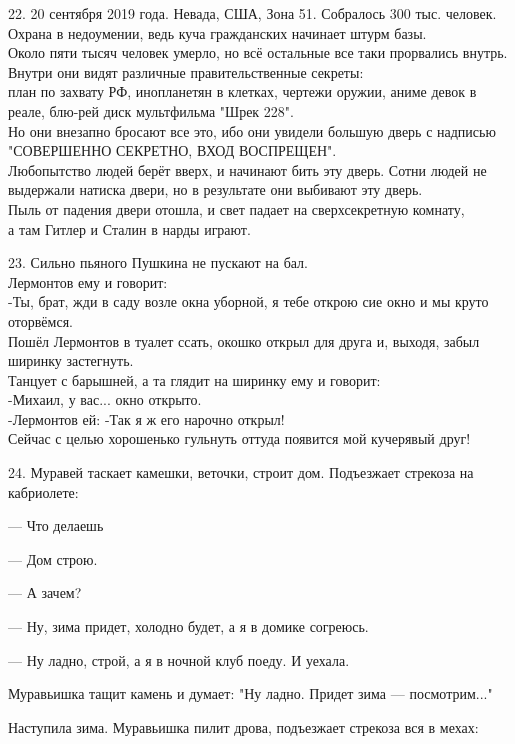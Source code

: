 \documentclass[a4paper,20pt,notitlepage]{extbook}
\begin{document}
	22. 20 сентября 2019 года. Невада, США, Зона 51. Собралось 300 тыс. человек.\\
	 Охрана в недоумении, ведь куча гражданских начинает штурм базы. \\
	 Около пяти тысяч человек умерло, но всё остальные все таки прорвались внутрь. Внутри они видят различные правительственные секреты:\\
	  план по захвату РФ, инопланетян в клетках, чертежи оружии, аниме девок в реале, блю-рей диск мультфильма "Шрек 228". \\
	  Но они внезапно бросают все это, ибо они увидели большую дверь с надписью "СОВЕРШЕННО СЕКРЕТНО, ВХОД ВОСПРЕЩЕН". \\
	  Любопытство людей берёт вверх, и начинают бить эту дверь. Сотни людей не выдержали натиска двери, но в результате они выбивают эту дверь.\\
	  Пыль от падения двери отошла, и свет падает на сверхсекретную комнату, \\
	  а там Гитлер и Сталин в нарды играют.
	  
	23. Сильно пьяного Пушкина не пускают на бал. \\
	Лермонтов ему и говорит:\\
	 -Ты, брат, жди в саду возле окна уборной, я тебе открою сие окно и мы круто оторвёмся. \\
	Пошёл Лермонтов в туалет ссать, окошко открыл для друга и, выходя, забыл ширинку застегнуть.\\
	Танцует с барышней, а та глядит на ширинку ему и говорит:\\
	-Михаил, у вас... окно открыто.\\
	-Лермонтов ей: -Так я ж его нарочно открыл! \\
	Сейчас с целью хорошенько гульнуть оттуда появится мой кучерявый друг!
	
	24. Муравей таскает камешки, веточки, строит дом. Подъезжает стрекоза на кабриолете:
	
	— Что делаешь
	
	— Дом строю.
	
	— А зачем?
	
	— Ну, зима придет, холодно будет, а я в домике согреюсь.
	
	— Ну ладно, строй, а я в ночной клуб поеду. И уехала.
	
	Муравьишка тащит камень и думает: "Ну ладно. Придет зима — посмотрим..."
	
	Наступила зима. Муравьишка пилит дрова, подъезжает стрекоза вся в мехах:
	
\end{document}
